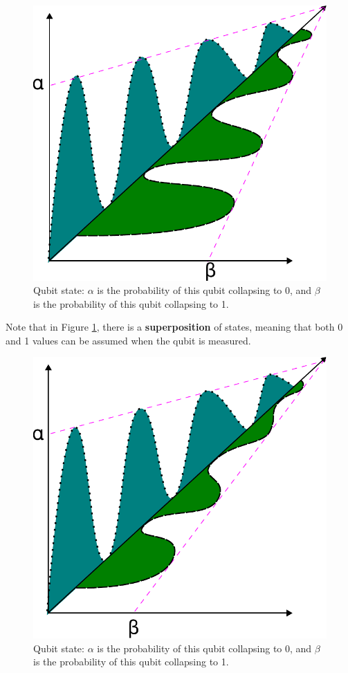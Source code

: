		\begin{figure}[h]
			\centering
			\includegraphics[width=0.7\linewidth]{images/photonState01}
			\caption[Qubit state]{Qubit state: $\alpha$ is the probability of this qubit collapsing to 0, and $\beta$ is the probability of this qubit collapsing to 1.}
			\label{fig:photonstate01}
		\end{figure}
		
		\par Note that in Figure \ref{fig:photonstate01}, there is a \textbf{superposition} of states, meaning that both 0 and 1 values can be assumed when the qubit is measured.
		
		\begin{figure}[h]
			\centering
			\includegraphics[width=0.7\linewidth]{images/photonState02}
			\caption[Qubit state 2]{Qubit state: $\alpha$ is the probability of this qubit collapsing to 0, and $\beta$ is the probability of this qubit collapsing to 1.}
			\label{fig:photonstate02}
		\end{figure}
		
